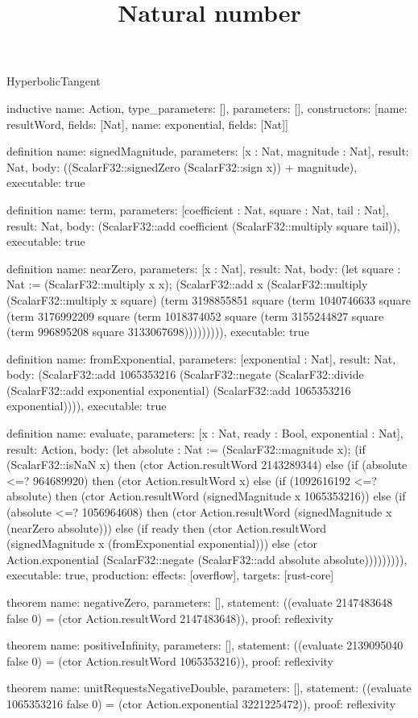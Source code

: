 \begin{lexlean}{HyperbolicTangent}
\title{Natural number}
\begin{semanticmodule}
inductive{
  name: Action,
  type_parameters: [],
  parameters: [],
  constructors: [{name: resultWord, fields: [Nat]}, {name: exponential, fields: [Nat]}]
}

definition{
  name: signedMagnitude,
  parameters: [x : Nat, magnitude : Nat],
  result: Nat,
  body: ((ScalarF32::signedZero (ScalarF32::sign x)) + magnitude),
  executable: true
}

definition{
  name: term,
  parameters: [coefficient : Nat, square : Nat, tail : Nat],
  result: Nat,
  body: (ScalarF32::add coefficient (ScalarF32::multiply square tail)),
  executable: true
}

definition{
  name: nearZero,
  parameters: [x : Nat],
  result: Nat,
  body: (let square : Nat := (ScalarF32::multiply x x); (ScalarF32::add x (ScalarF32::multiply (ScalarF32::multiply x square) (term 3198855851 square (term 1040746633 square (term 3176992209 square (term 1018374052 square (term 3155244827 square (term 996895208 square 3133067698))))))))),
  executable: true
}

definition{
  name: fromExponential,
  parameters: [exponential : Nat],
  result: Nat,
  body: (ScalarF32::add 1065353216 (ScalarF32::negate (ScalarF32::divide (ScalarF32::add exponential exponential) (ScalarF32::add 1065353216 exponential)))),
  executable: true
}

definition{
  name: evaluate,
  parameters: [x : Nat, ready : Bool, exponential : Nat],
  result: Action,
  body: (let absolute : Nat := (ScalarF32::magnitude x); (if (ScalarF32::isNaN x) then (ctor Action.resultWord 2143289344) else (if (absolute <=? 964689920) then (ctor Action.resultWord x) else (if (1092616192 <=? absolute) then (ctor Action.resultWord (signedMagnitude x 1065353216)) else (if (absolute <=? 1056964608) then (ctor Action.resultWord (signedMagnitude x (nearZero absolute))) else (if ready then (ctor Action.resultWord (signedMagnitude x (fromExponential exponential))) else (ctor Action.exponential (ScalarF32::negate (ScalarF32::add absolute absolute))))))))),
  executable: true,
  production: {effects: [overflow], targets: [rust-core]}
}

theorem{
  name: negativeZero,
  parameters: [],
  statement: ((evaluate 2147483648 false 0) = (ctor Action.resultWord 2147483648)),
  proof: reflexivity{}
}

theorem{
  name: positiveInfinity,
  parameters: [],
  statement: ((evaluate 2139095040 false 0) = (ctor Action.resultWord 1065353216)),
  proof: reflexivity{}
}

theorem{
  name: unitRequestsNegativeDouble,
  parameters: [],
  statement: ((evaluate 1065353216 false 0) = (ctor Action.exponential 3221225472)),
  proof: reflexivity{}
}
\end{semanticmodule}
\end{lexlean}
